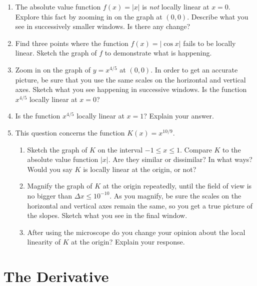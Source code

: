\begin{enumerate}
\item The absolute value function $f(x) = |x|$ is {\em not\/} locally
linear at $x=0$.  Explore this fact by zooming in on the graph at $(0,
0)$.  Describe what you see in successively smaller windows.  Is there
any change?



\item Find three points where the function $f(x) = |\cos{x}|$ fails to
be locally linear.  Sketch the graph of $f$ to demonstrate what is
happening.



\item Zoom in on the graph of $y = x^{4/5}$ at $(0, 0)$.  In order to
get an accurate picture, be sure that you use the same scales on the
horizontal and vertical axes.  Sketch what you see happening in
successive windows.  Is the function $x^{4/5}$ locally linear at $x =
0$?



\item Is the function $x^{4/5}$ locally linear at $x = 1$?  Explain
your answer.



\item This question concerns the function $K(x) = x^{10/9}$.

  \begin{enumerate}
  \item Sketch the graph of $K$ on the interval $-1 \leq x \leq 1$.
Compare $K$ to the absolute value function $|x|$.  Are they similar or
dissimilar?  In what ways?  Would you say $K$ is locally linear at the
origin, or not?

  \item Magnify the graph of $K$ at the origin repeatedly, until the
field of view is no bigger than $\Delta x \leq 10^{-10}$.  As you
magnify, be sure the scales on the horizontal and vertical axes remain
the same, so you get a true picture of the slopes.  Sketch what you
see in the final window.

  \item After using the microscope do you change your opinion about the
local linearity of $K$ at the origin?  Explain your response.


\end{enumerate}
\end{enumerate}
\section{The Derivative}
\label{sec:the-derivative}

